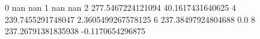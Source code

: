 0 nan nan
1 nan nan
2 277.5467224121094 40.1617431640625
4 239.7455291748047 2.3605499267578125
6 237.38497924804688 0.0
8 237.26791381835938 -0.1170654296875
